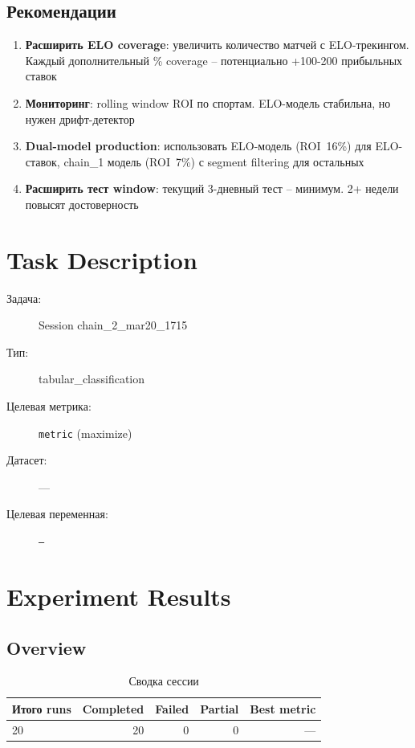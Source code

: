 \documentclass[12pt,a4paper]{article}
\begin{document}
\subsection{Рекомендации}
\begin{enumerate}
  \item \textbf{Расширить ELO coverage}: увеличить количество матчей с ELO-трекингом. Каждый дополнительный \% coverage -- потенциально +100-200 прибыльных ставок
  \item \textbf{Мониторинг}: rolling window ROI по спортам. ELO-модель стабильна, но нужен дрифт-детектор
  \item \textbf{Dual-model production}: использовать ELO-модель (ROI~16\%) для ELO-ставок, chain\_1 модель (ROI~7\%) с segment filtering для остальных
  \item \textbf{Расширить тест window}: текущий 3-дневный тест -- минимум. 2+ недели повысят достоверность
\end{enumerate}




\section{Task Description}

\begin{description}
    \item[Задача:] Session chain\_2\_mar20\_1715
    \item[Тип:] tabular\_classification
    \item[Целевая метрика:] \texttt{metric}
        (maximize)
    \item[Датасет:] ---
    \item[Целевая переменная:] \texttt{---}
\end{description}




\section{Experiment Results}

\subsection{Overview}

\begin{table}[H]
\centering
\caption{Сводка сессии}
\begin{tabular}{lrrrr}
\toprule
Итого runs & Completed & Failed & Partial & Best metric \\
\midrule
20 & \textcolor{passcolor}{20}
    & \textcolor{failcolor}{0}
    & \textcolor{partialcolor}{0}
    & --- \\
\bottomrule
\end{tabular}
\end{table}
\end{document}
